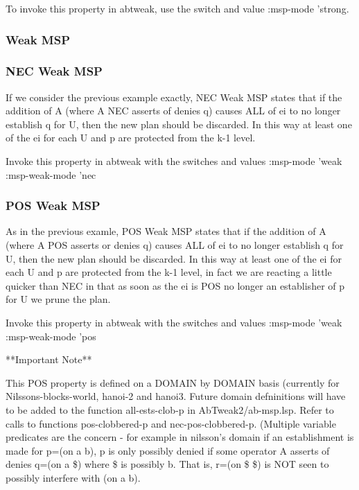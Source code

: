 To invoke this property in abtweak, use the switch and value :msp-mode 'strong.

\subsubsection{Weak MSP}

\subsubsection*{NEC Weak MSP}

If we consider the previous example exactly, NEC Weak MSP states that if the
addition of A (where A NEC asserts of denies q) causes ALL of ei to no longer 
establish q for U, then the new plan should be discarded.  In this way at least
one of the ei for each U and p are protected from the k-1 level.

Invoke this property in abtweak with the switches and values 
:msp-mode 'weak :msp-weak-mode 'nec


\subsubsection*{POS Weak MSP}

As in the previous examle, POS Weak MSP states that if the 
addition of A (where A POS asserts or denies q) causes ALL of ei to no longer 
establish q for U, then the new plan should be discarded.  In this way at least
one of the ei for each U and p are protected from the k-1 level, in fact we are
reacting a little quicker than NEC in that as soon as the ei is POS no longer
an establisher of p for U we prune the plan.

Invoke this property in abtweak with the switches and values 
:msp-mode 'weak :msp-weak-mode 'pos

\begin{center}
**Important Note**
\end{center}

This POS property is defined on a DOMAIN by DOMAIN basis (currently
for Nilssons-blocks-world, hanoi-2 and hanoi3.  Future domain
defninitions will have to be added to the function all-ests-clob-p in
AbTweak2/ab-msp.lsp.  Refer to calls to functions pos-clobbered-p and
nec-pos-clobbered-p.  (Multiple variable predicates are the concern -
for example in nilsson's domain
 if an establishment is made for p=(on a b), p is only possibly denied
if some operator A asserts of denies q=(on a \$) where \$ is possibly b.
That is, r=(on \$ \$) is NOT seen to possibly interfere with (on a b).

